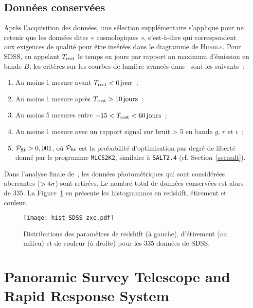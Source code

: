 \documentclass[../main/main.tex]{subfiles}
\begin{document}
\subsection{Données conservées}\label{ssec:sdssdata}

Après l'acquisition des données, une sélection supplémentaire s'applique pour ne
retenir que les données dites « cosmologiques », c'est-à-dire qui correspondent
aux exigences de qualité pour être insérées dans le diagramme de
\textsc{Hubble}. Pour SDSS, en appelant $T_{\rm rest}$ le temps en jours par
rapport au maximum d'émission en bande $B$, les critères sur les courbes de
lumière avancés dans~\cite{kessler2009b} sont les suivants~:

\begin{enumerate}
    \item Au moins 1 mesure avant $T_{\rm rest} < \SI{0}{jour}$~;
    \item Au moins 1 mesure après $T_{\rm rest} > \SI{10}{jours}$~;
    \item Au moins 5 mesures entre $-15 < T_{\rm rest} < \SI{60}{jours}$~;
    \item Au moins 1 mesure avec un rapport signal sur bruit > 5 en bande $g$,
        $r$ et $i$~;
    \item $\mathcal{P}_{\rm fit} > 0,001$, où $\mathcal{P}_{\rm fit}$ est la
        probabilité d'optimisation par degré de liberté donné par le programme
        \texttt{MLCS2K2}, similaire à \texttt{SALT2.4} (cf.
        Section~\ref{sec:salt}).
\end{enumerate}
Dans l'analyse finale de~\cite{scolnic2018}, les données photométriques qui sont
considérées aberrantes ($>4\sigma$) sont retirées. Le nombre total de données
conservées est alors de 335. La Figure~\ref{fig:sdsshist} en présente les
histogrammes en redshift, étirement et couleur.

\begin{figure}[ht]
    \centering
    \texttt{[image: hist\_SDSS\_zxc.pdf]}
    \caption[Distributions des paramètres de redshift, étirement et couleur de
    SDSS]{Distributions des paramètres de redshift (à gauche), d'étirement (au
    milieu) et de couleur (à droite) pour les 335 données de SDSS.}
    \label{fig:sdsshist}
\end{figure}

\section{Panoramic Survey Telescope and Rapid Response
System}\label{sec:ps1}
\end{document}
